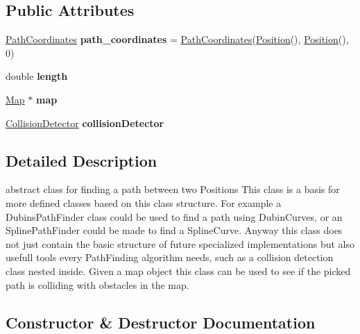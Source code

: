 \subsection*{Public Attributes}
\begin{DoxyCompactItemize}
\item 
\mbox{\label{class_path_finder_a528b68598c5a5c2fe5df8cff5ebe1caa}} 
\mbox{\hyperlink{class_path_coordinates}{Path\+Coordinates}} {\bfseries path\+\_\+coordinates} = \mbox{\hyperlink{class_path_coordinates}{Path\+Coordinates}}(\mbox{\hyperlink{class_position}{Position}}(), \mbox{\hyperlink{class_position}{Position}}(), 0)
\item 
\mbox{\label{class_path_finder_a34176bf4f44d8ff4e30f5b50dd7fc535}} 
double {\bfseries length}
\item 
\mbox{\label{class_path_finder_ac83316280ebe15705e2fd115723201de}} 
\mbox{\hyperlink{class_map}{Map}} $\ast$ {\bfseries map}
\item 
\mbox{\label{class_path_finder_ae3ac1663bc734e1ea6fb87210b09d923}} 
\mbox{\hyperlink{class_path_finder_1_1_collision_detector}{Collision\+Detector}} {\bfseries collision\+Detector}
\end{DoxyCompactItemize}


\subsection{Detailed Description}
abstract class for finding a path between two Positions  This class is a basis for more defined classes based on this class structure. For example a Dubins\+Path\+Finder class could be used to find a path using Dubin\+Curves, or an Spline\+Path\+Finder could be made to find a Spline\+Curve. Anyway this class does not just contain the basic structure of future specialized implementations but also usefull tools every Path\+Finding algorithm needs, such as a collision detection class nested inside. Given a map object this class can be used to see if the picked path is colliding with obstacles in the map. 

\subsection{Constructor \& Destructor Documentation}
\mbox{\label{class_path_finder_af9395c561cc945d0f652aef244b3c7b3}} 
